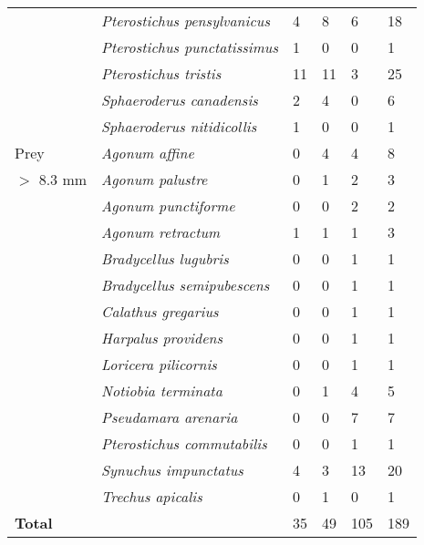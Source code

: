 \begin{table}[h]
\begin{tabular}{llllll}
                            & \textit{Pterostichus pensylvanicus}       & 4 & 8 & 6 & 18 \\
                            & \textit{Pterostichus punctatissimus}      & 1 & 0 & 0 & 1 \\
                            & \textit{Pterostichus tristis}             & 11 & 11 & 3 & 25 \\
                            & \textit{Sphaeroderus canadensis}          & 2 & 4 & 0 & 6 \\
                            & \textit{Sphaeroderus nitidicollis}        & 1 & 0 & 0 & 1 \\
                            \hline 
        Prey                & \textit{Agonum affine}                    & 0 & 4 & 4 & 8 \\ 
        $>$ 8.3 mm          & \textit{Agonum palustre}                  & 0 & 1 & 2 & 3 \\
                            & \textit{Agonum punctiforme}               & 0 & 0 & 2 & 2 \\ 
                            & \textit{Agonum retractum}                 & 1 & 1 & 1 & 3 \\ 
                            & \textit{Bradycellus lugubris}             & 0 & 0 & 1 & 1 \\
                            & \textit{Bradycellus semipubescens}        & 0 & 0 & 1 & 1 \\
                            & \textit{Calathus gregarius}               & 0 & 0 & 1 & 1 \\
                            & \textit{Harpalus providens}               & 0 & 0 & 1 & 1 \\
                            & \textit{Loricera pilicornis}              & 0 & 0 & 1 & 1 \\
                            & \textit{Notiobia terminata}               & 0 & 1 & 4 & 5 \\
                            & \textit{Pseudamara arenaria}              & 0 & 0 & 7 & 7 \\
                            & \textit{Pterostichus commutabilis}        & 0 & 0 & 1 & 1 \\
                            & \textit{Synuchus impunctatus}             & 4 & 3 & 13 & 20 \\
                            & \textit{Trechus apicalis}                 & 0 & 1 & 0 & 1 \\
                            \hline 
        \textbf{Total}      &                                           & 35 & 49 & 105 & 189 \\
        \hline
    \end{tabular}
  \end{table}

